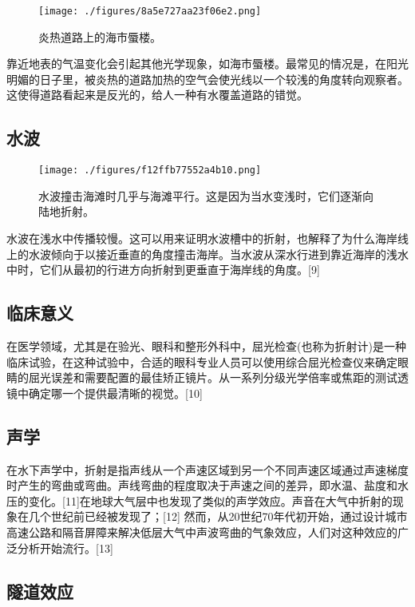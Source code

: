 \begin{figure}[ht]
\centering
\texttt{[image: ./figures/8a5e727aa23f06e2.png]}
\caption{炎热道路上的海市蜃楼。} \label{fig_ZS_8}
\end{figure}

靠近地表的气温变化会引起其他光学现象，如海市蜃楼。最常见的情况是，在阳光明媚的日子里，被炎热的道路加热的空气会使光线以一个较浅的角度转向观察者。这使得道路看起来是反光的，给人一种有水覆盖道路的错觉。

\subsection{水波}


\begin{figure}[ht]
\centering
\texttt{[image: ./figures/f12ffb77552a4b10.png]}
\caption{水波撞击海滩时几乎与海滩平行。这是因为当水变浅时，它们逐渐向陆地折射。} \label{fig_ZS_9}
\end{figure}

水波在浅水中传播较慢。这可以用来证明水波槽中的折射，也解释了为什么海岸线上的水波倾向于以接近垂直的角度撞击海岸。当水波从深水行进到靠近海岸的浅水中时，它们从最初的行进方向折射到更垂直于海岸线的角度。[9]

\subsection{临床意义}

在医学领域，尤其是在验光、眼科和整形外科中，屈光检查(也称为折射计)是一种临床试验，在这种试验中，合适的眼科专业人员可以使用综合屈光检查仪来确定眼睛的屈光误差和需要配置的最佳矫正镜片。从一系列分级光学倍率或焦距的测试透镜中确定哪一个提供最清晰的视觉。[10]

\subsection{声学}

在水下声学中，折射是指声线从一个声速区域到另一个不同声速区域通过声速梯度时产生的弯曲或弯曲。声线弯曲的程度取决于声速之间的差异，即水温、盐度和水压的变化。[11]在地球大气层中也发现了类似的声学效应。声音在大气中折射的现象在几个世纪前已经被发现了；[12] 然而，从20世纪70年代初开始，通过设计城市高速公路和隔音屏障来解决低层大气中声波弯曲的气象效应，人们对这种效应的广泛分析开始流行。[13]

\subsection{隧道效应}

